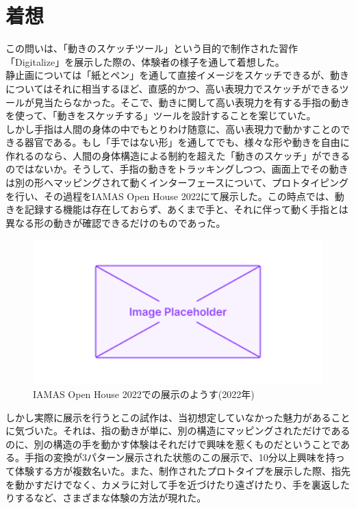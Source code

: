 \section{着想}
\label{prototyping_concept_making}
この問いは、「動きのスケッチツール」という目的で制作された習作「Digitalize」を展示した際の、体験者の様子を通して着想した。\\
静止画については「紙とペン」を通して直接イメージをスケッチできるが、動きについてはそれに相当するほど、直感的かつ、高い表現力でスケッチができるツールが見当たらなかった。そこで、動きに関して高い表現力を有する手指の動きを使って、「動きをスケッチする」ツールを設計することを案じていた。\\
しかし手指は人間の身体の中でもとりわけ随意に、高い表現力で動かすことのできる器官である。もし「手ではない形」を通してでも、様々な形や動きを自由に作れるのなら、人間の身体構造による制約を超えた「動きのスケッチ」ができるのではないか。そうして、手指の動きをトラッキングしつつ、画面上でその動きは別の形へマッピングされて動くインターフェースについて、プロトタイピングを行い、その過程をIAMAS Open House 2022にて展示した。この時点では、動きを記録する機能は存在しておらず、あくまで手と、それに伴って動く手指とは異なる形の動きが確認できるだけのものであった。

\begin{figure}[H]
  \centering
  \includegraphics[width=15cm]{img/placeholder.png}
  \caption{IAMAS Open House 2022での展示のようす(2022年)}
  \label{fig:exhibit_2022}
\end{figure}

しかし実際に展示を行うとこの試作は、当初想定していなかった魅力があることに気づいた。それは、指の動きが単に、別の構造にマッピングされただけであるのに、別の構造の手を動かす体験はそれだけで興味を惹くものだということである。手指の変換が3パターン展示された状態のこの展示で、10分以上興味を持って体験する方が複数名いた。また、制作されたプロトタイプを展示した際、指先を動かすだけでなく、カメラに対して手を近づけたり遠ざけたり、手を裏返したりするなど、さまざまな体験の方法が現れた。

